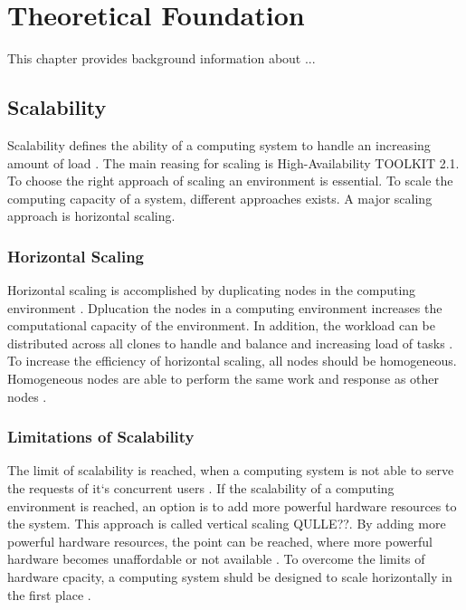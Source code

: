 \chapter{Theoretical Foundation}
\label{sec:related}
%

This chapter provides background information about ...

\section{Scalability}
Scalability defines the ability of a computing system to handle an increasing amount of load \cite{Farcic2017Toolkit21}.
The main reasing for scaling is High-Availability TOOLKIT 2.1.
To choose the right approach of scaling an environment is essential.
To scale the computing capacity of a system, different approaches exists. A major scaling approach is horizontal scaling.



\subsection{Horizontal Scaling}
Horizontal scaling is accomplished by duplicating nodes in the computing environment \cite{Wilder2012CloudPatterns}.
Dplucation the nodes in a computing environment increases the computational capacity of the environment. In addition, the workload can be distributed across all clones to handle and balance and increasing load of tasks \cite{Wilder2012CloudPatterns, Abbott2015ScalabilityArt}. 
To increase the efficiency of horizontal scaling, all nodes should be homogeneous. Homogeneous nodes are able to perform the same work and response as other nodes \cite{Abbott2015ScalabilityArt}.


\subsection{Limitations of Scalability}
The limit of scalability is reached, when a computing system is not able to serve the requests of it`s concurrent users \cite{Wilder2012CloudPatterns}.
If the scalability of a computing environment is reached, an option is to add more powerful hardware resources to the system. This approach is called vertical scaling QULLE??. By adding more powerful hardware resources, the point can be reached, where more powerful hardware becomes unaffordable or not available \cite{Wilder2012CloudPatterns}.
To overcome the limits of hardware cpacity, a computing system shuld be designed to scale horizontally in the first place \cite{Abbott2015ScalabilityArt}.


